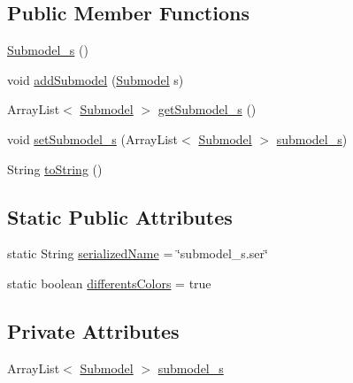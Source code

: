 \subsection*{Public Member Functions}
\begin{DoxyCompactItemize}
\item 
\hyperlink{classit_1_1isislab_1_1masonhelperdocumentation_1_1_o_d_d_1_1_submodel__s_a77585ed86ce1a49c0a5bcb43068b7300}{Submodel\-\_\-s} ()
\item 
void \hyperlink{classit_1_1isislab_1_1masonhelperdocumentation_1_1_o_d_d_1_1_submodel__s_a26f64ad20d2c8f4b954b7935f7bacf76}{add\-Submodel} (\hyperlink{classit_1_1isislab_1_1masonhelperdocumentation_1_1_o_d_d_1_1_submodel}{Submodel} s)
\item 
Array\-List$<$ \hyperlink{classit_1_1isislab_1_1masonhelperdocumentation_1_1_o_d_d_1_1_submodel}{Submodel} $>$ \hyperlink{classit_1_1isislab_1_1masonhelperdocumentation_1_1_o_d_d_1_1_submodel__s_afe2141a5dacaecbbfc44a3d4d10a9d37}{get\-Submodel\-\_\-s} ()
\item 
void \hyperlink{classit_1_1isislab_1_1masonhelperdocumentation_1_1_o_d_d_1_1_submodel__s_ad8d6637e97e5cac8b8d01d54cfe86902}{set\-Submodel\-\_\-s} (Array\-List$<$ \hyperlink{classit_1_1isislab_1_1masonhelperdocumentation_1_1_o_d_d_1_1_submodel}{Submodel} $>$ \hyperlink{classit_1_1isislab_1_1masonhelperdocumentation_1_1_o_d_d_1_1_submodel__s_abf82b40f163d967edfba01b8050929d5}{submodel\-\_\-s})
\item 
String \hyperlink{classit_1_1isislab_1_1masonhelperdocumentation_1_1_o_d_d_1_1_submodel__s_a4f23339b028b73e93d58b4aa051b9947}{to\-String} ()
\end{DoxyCompactItemize}
\subsection*{Static Public Attributes}
\begin{DoxyCompactItemize}
\item 
static String \hyperlink{classit_1_1isislab_1_1masonhelperdocumentation_1_1_o_d_d_1_1_submodel__s_a7f63b7178d8b6b8d9da0c24d79f031f6}{serialized\-Name} = \char`\"{}submodel\-\_\-s.\-ser\char`\"{}
\item 
static boolean \hyperlink{classit_1_1isislab_1_1masonhelperdocumentation_1_1_o_d_d_1_1_submodel__s_a135ce4524aa1bc14a7e6c653e47f188e}{differents\-Colors} = true
\end{DoxyCompactItemize}
\subsection*{Private Attributes}
\begin{DoxyCompactItemize}
\item 
Array\-List$<$ \hyperlink{classit_1_1isislab_1_1masonhelperdocumentation_1_1_o_d_d_1_1_submodel}{Submodel} $>$ \hyperlink{classit_1_1isislab_1_1masonhelperdocumentation_1_1_o_d_d_1_1_submodel__s_abf82b40f163d967edfba01b8050929d5}{submodel\-\_\-s}
\end{DoxyCompactItemize}
